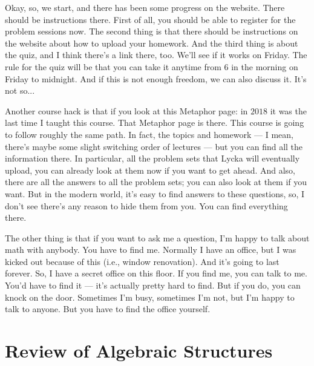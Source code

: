\begin{speech}[00:00:00 - 00:01:48]
Okay, so, we start, and there has been some progress on the website. There should be instructions there. First of all, you should be able to register for the problem sessions now. The second thing is that there should be instructions on the website about how to upload your homework. And the third thing is about the quiz, and I think there's a link there, too. We'll see if it works on Friday. The rule for the quiz will be that you can take it anytime from $6$ in the morning on Friday to midnight. And if this is not enough freedom, we can also discuss it. It's not so...

Another course hack is that if you look at this Metaphor page: in $2018$  it was the last time I taught this course. That Metaphor page is there. This course is going to follow roughly the same path. In fact, the topics and homework --- I mean, there's maybe some slight switching order of lectures --- but you can find all the information there. In particular, all the problem sets that Lycka will eventually upload, you can already look at them now if you want to get ahead. And also, there are all the answers to all the problem sets; you can also look at them if you want. But in the modern world, it's easy to find answers to these questions, so, I don't see there's any reason to hide them from you. You can find everything there.

The other thing is that if you want to ask me a question, I'm happy to talk about math with anybody. You have to find me. Normally I have an office, but I was kicked out because of this  (i.e., window renovation). And it's going to last forever. So, I have a secret office on this floor. If you find me, you can talk to me. You'd have to find it --- it's actually pretty hard to find. But if you do, you can knock on the door. Sometimes I'm busy, sometimes I'm not, but I'm happy to talk to anyone. But you have to find the office yourself.
\end{speech}

\begin{overview}
\end{overview}

\section{Review of Algebraic Structures}

